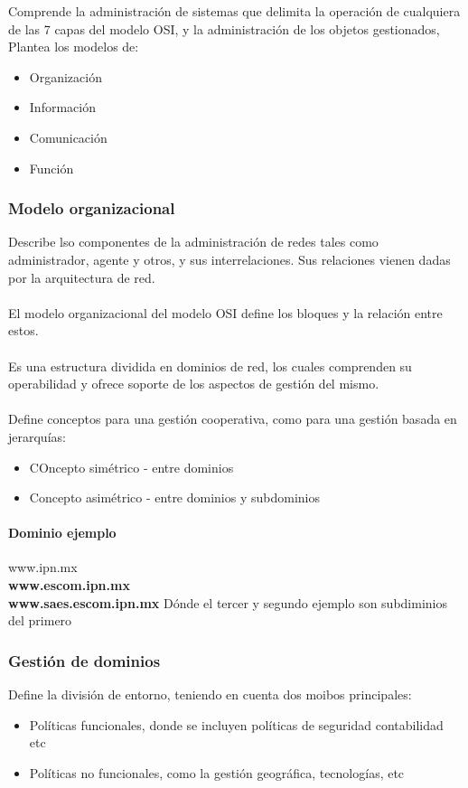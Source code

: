 Comprende la administración de sistemas que delimita la operación de cualquiera de las 7 capas del modelo OSI, y la administración de los objetos gestionados,
Plantea los modelos de:
\begin{itemize}
    \item Organización
    \item Información
    \item Comunicación
    \item Función
\end{itemize}

\subsubsection{Modelo organizacional}
Describe lso componentes de la administración de redes tales como administrador, agente y otros, y sus interrelaciones.
Sus relaciones vienen dadas por la arquitectura de red.\\\\
El modelo organizacional del modelo OSI define los bloques y la relación entre estos.\\\\

Es una estructura dividida en dominios de red, los cuales comprenden su operabilidad y ofrece soporte de los aspectos de gestión del mismo.\\\\
Define conceptos para una gestión cooperativa, como para una gestión basada en jerarquías:
\begin{itemize}
    \item COncepto simétrico - entre dominios
    \item Concepto asimétrico - entre dominios y subdominios
\end{itemize}

\paragraph{Dominio ejemplo}
www.ipn.mx \\
\textbf{www.escom.ipn.mx}\\
\textbf{www.saes.escom.ipn.mx}
Dónde el tercer y segundo ejemplo son subdiminios del primero 
\subsubsection{Gestión de dominios}
Define la división de entorno, teniendo en cuenta dos moibos principales:
\begin{itemize}
    \item {Políticas funcionales, donde se incluyen políticas de seguridad contabilidad etc}
    \item {Políticas no funcionales, como la gestión geográfica, tecnologías, etc}
\end{itemize}

